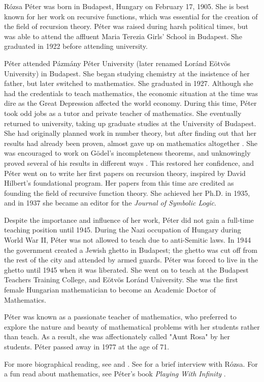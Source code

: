 \documentclass[../../../include/open-logic-section]{subfiles}
\begin{document}


 
R\'{o}zsa P\'{e}ter was born in Budapest, Hungary on February 17, 1905. She
is best known for her work on recursive functions, which was essential for
the creation of the field of recursion theory. P\'{e}ter was raised during
harsh political times, but was able to attend the affluent Maria Terezia
Girls' School in Budapest. She graduated in 1922 before attending
university.

P\'{e}ter attended P\'{a}zm\'{a}ny P\'{e}ter University (later renamed
Lor\'{a}nd E\"{o}tv\"{o}s University) in Budapest. She began studying
chemistry at the insistence of her father, but later switched to
mathematics. She graduated in 1927. Although she had the credentials to
teach mathematics, the economic situation at the time was dire as the Great
Depression affected the world economy. During this time, P\'{e}ter took odd
jobs as a tutor and private teacher of mathematics. She eventually returned
to university, taking up graduate studies at the University of Budapest.
She had originally planned work in number theory, but after finding out
that her results had already been proven, almost gave up on mathematics
altogether \citep{Oconnor2014}. She was encouraged to work on G\"{o}del's
incompleteness theorems, and unknowingly proved several of his results in
different ways \citep{Oconnor2014}. This restored her confidence, and
P\'{e}ter went on to write her first papers on recursion theory, inspired
by David Hilbert's foundational program. Her papers from this time are
credited as founding the field of recursive function theory. She achieved
her Ph.D. in 1935, and in 1937 she became an editor for the \emph{Journal of
Symbolic Logic}.

Despite the importance and influence of her work, P\'{e}ter did not gain a
full-time teaching position until 1945. During the Nazi occupation of
Hungary during World War II, P\'{e}ter was not allowed to teach due to
anti-Semitic laws. In 1944 the government created a Jewish ghetto in
Budapest; the ghetto was cut off from the rest of the city and attended by
armed guards. P\'{e}ter was forced to live in the ghetto until 1945 when it
was liberated. She went on to teach at the Budapest Teachers Training
College, and E\"{o}tv\"{o}s Lor\'{a}nd University. She was the first female
Hungarian mathematician to become an Academic Doctor of Mathematics.

P\'{e}ter was known as a passionate teacher of mathematics, who preferred
to explore the nature and beauty of mathematical problems with her students
rather than teach. As a result, she was affectionately called "Aunt Rosa"
by her students. P\'{e}ter passed away in 1977 at the age of 71.

\begin{reading} For more biographical reading, see \citet{Oconnor2014} and
\citet{Andrasfai1986}. See \citet{Tamassy1994} for a brief interview with
R\'{o}zsa. For a fun read about mathematics, see P\'{e}ter's book
\emph{Playing With Infinity} \citep{Peter2010}. \end{reading}
\end{document}
